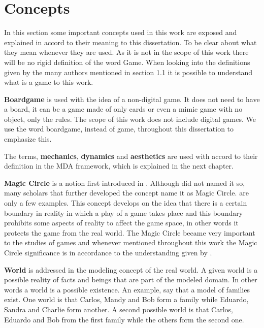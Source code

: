 \section{Concepts}
In this section some important concepts used in this work are exposed and explained in accord to their meaning to this dissertation. To be clear about what they mean whenever they are used. As it is not in the scope of this work there will be no rigid definition of the word Game. When looking into the definitions given by the many authors mentioned in section 1.1 it is possible to understand what is a game to this work. 

\textbf{Boardgame} is used with the idea of a non-digital game. It does not need to have a board, it can be a game made of only cards or even a mimic game with no object, only the rules. The scope of this work does not include digital games. We use the word boardgame, instead of game, throughout this dissertation to emphasize this.

The terms, \textbf{mechanics}, \textbf{dynamics} and \textbf{aesthetics} are used with accord to their definition in the MDA framework, which is explained in the next chapter. 

\textbf{Magic Circle} is a notion first introduced in \cite{huizinga2014homo}. Although \citeauthor{huizinga2014homo} did not named it so, many scholars that further developed the concept name it as Magic Circle. \cite{salen2004rules,bateman_implicit_2015} are only a few examples. This concept develops on the idea that there is a certain boundary in reality in which a play of a game takes place and this boundary prohibits some aspects of reality to affect the game space, in other words it protects the game from the real world. The Magic Circle became very important to the studies of games and whenever mentioned throughout this work the Magic Circle significance is in accordance to the understanding given by \cite{salen2004rules}.

\textbf{World} is addressed in the modeling concept of the real world. A given world is a possible reality of facts and beings that are part of the modeled domain. In other words a world is a possible existence. An example, say that a model of families exist. One world is that Carlos, Mandy and Bob form a family while Eduardo, Sandra and Charlie form another. A second possible world is that Carlos, Eduardo and Bob from the first family while the others form the second one. 

